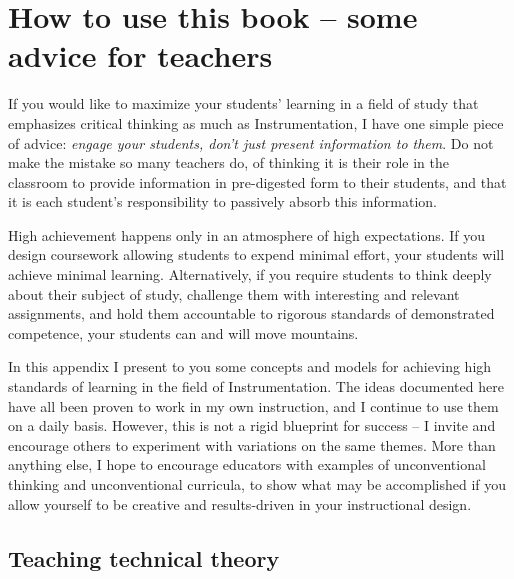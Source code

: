 \chapter{How to use this book -- some advice for teachers}

If you would like to maximize your students' learning in a field of study that emphasizes critical thinking as much as Instrumentation, I have one simple piece of advice: \textit{engage your students, don't just present information to them}.  Do not make the mistake so many teachers do, of thinking it is their role in the classroom to provide information in pre-digested form to their students, and that it is each student's responsibility to passively absorb this information.

High achievement happens only in an atmosphere of high expectations.  If you design coursework allowing students to expend minimal effort, your students will achieve minimal learning.  Alternatively, if you require students to think deeply about their subject of study, challenge them with interesting and relevant assignments, and hold them accountable to rigorous standards of demonstrated competence, your students can and will move mountains.

In this appendix I present to you some concepts and models for achieving high standards of learning in the field of Instrumentation.  The ideas documented here have all been proven to work in my own instruction, and I continue to use them on a daily basis.  However, this is not a rigid blueprint for success -- I invite and encourage others to experiment with variations on the same themes.  More than anything else, I hope to encourage educators with examples of unconventional thinking and unconventional curricula, to show what may be accomplished if you allow yourself to be creative and results-driven in your instructional design.









\filbreak
\section{Teaching technical theory}

